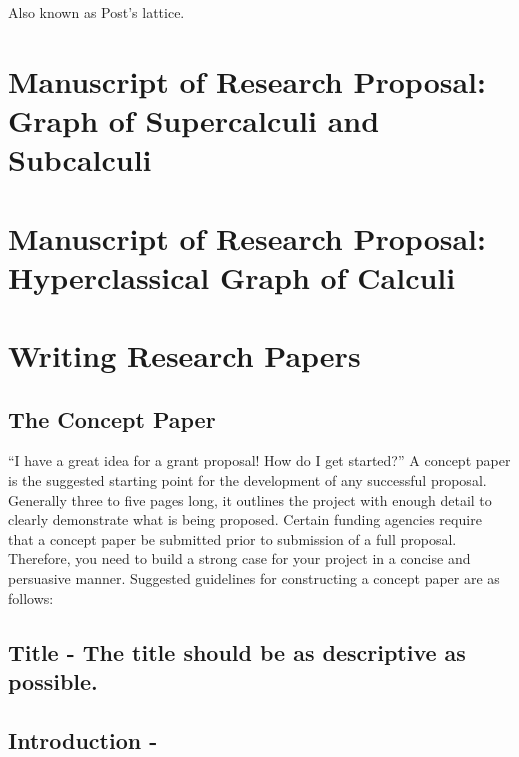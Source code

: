 Also known as Post's lattice.

\hypertarget{manuscript-of-research-proposal-graph-of-supercalculi-and-subcalculi}{%
\section{Manuscript of Research Proposal: Graph of Supercalculi and
Subcalculi}\label{manuscript-of-research-proposal-graph-of-supercalculi-and-subcalculi}}

\hypertarget{manuscript-of-research-proposal-hyperclassical-graph-of-calculi}{%
\section{Manuscript of Research Proposal: Hyperclassical Graph of
Calculi}\label{manuscript-of-research-proposal-hyperclassical-graph-of-calculi}}

\hypertarget{writing-research-papers}{%
\section{Writing Research Papers}\label{writing-research-papers}}

\hypertarget{the-concept-paper}{%
\subsection{The Concept Paper}\label{the-concept-paper}}

``I have a great idea for a grant proposal! How do I get started?'' A
concept paper is the suggested starting point for the development of any
successful proposal. Generally three to five pages long, it outlines the
project with enough detail to clearly demonstrate what is being
proposed. Certain funding agencies require that a concept paper be
submitted prior to submission of a full proposal. Therefore, you need to
build a strong case for your project in a concise and persuasive manner.
Suggested guidelines for constructing a concept paper are as follows:

\hypertarget{title---the-title-should-be-as-descriptive-as-possible.-1}{%
\subsection{Title - The title should be as descriptive as
possible.}\label{title---the-title-should-be-as-descriptive-as-possible.-1}}

\hypertarget{introduction---1}{%
\subsection{\texorpdfstring{ Introduction -
}{ Introduction - }}\label{introduction---1}}

